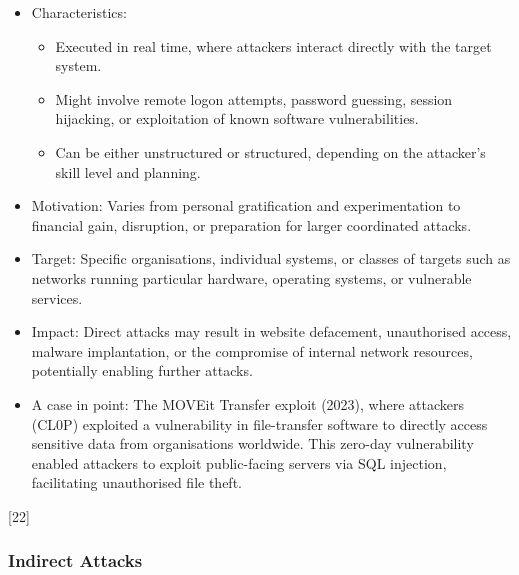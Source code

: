 \begin{itemize}
  \item Characteristics:
  \begin{itemize}
    \item Executed in real time, where attackers interact directly with the target system.
    \item Might involve remote logon attempts, password guessing, session hijacking, or exploitation of known software vulnerabilities.
    \item Can be either unstructured or structured, depending on the attacker's skill level and planning.
  \end{itemize}
  \item Motivation: Varies from personal gratification and experimentation to financial gain, disruption, or preparation for larger coordinated attacks.
  \item Target: Specific organisations, individual systems, or classes of targets such as networks running particular hardware, operating systems, or vulnerable services.
  \item Impact: Direct attacks may result in website defacement, unauthorised access, malware implantation, or the compromise of internal network resources, potentially enabling further attacks.
  \item A case in point: The MOVEit Transfer exploit (2023), where attackers (CL0P) exploited a vulnerability in file-transfer software to directly access sensitive data from organisations worldwide. This zero-day vulnerability enabled attackers to exploit public-facing servers via SQL injection, facilitating unauthorised file theft.
\end{itemize}

[22]

\subsubsection{Indirect Attacks}

